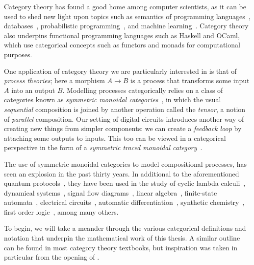 Category theory has found a good home among computer scientists, as
it can be used to shed new light upon topics such as semantics of programming
languages~\cite{oles1982categorytheoretic}, databases~\cite{spivak2012functorial},
probabilistic programming~\cite{cho2019disintegration,fritz2020synthetic}, and
machine learning~\cite{fong2019backprop,cockett2020reverse}.
Category theory also underpins functional programming languages such as
Haskell and OCaml, which use categorical concepts such as functors and monads
for computational purposes.

One application of category theory we are particularly interested in is that of
\emph{process theories}; here a morphism \(A \to B\) is a process that
transforms some input \(A\) into an output \(B\).
Modelling processes categorically relies on a class of categories known as
\emph{symmetric monoidal categories}~\cite{maclane1963natural}, in which the
usual \emph{sequential} composition is joined by another operation called the
\emph{tensor}, a notion of \emph{parallel} composition.
Our setting of digital circuits introduces another way of creating new things
from simpler components: we can create a \emph{feedback loop} by attaching some
outputs to inputs.
This too can be viewed in a categorical perspective in the form of a
\emph{symmetric traced monoidal category}~\cite{joyal1996traced}.

The use of symmetric monoidal categories to model compositional processes, has
seen an explosion in the past thirty years.
In additional to the aforementioned quantum protocols~\cite{coecke2008interacting},
they have been used in the study of cyclic lambda
calculi~\cite{hasegawa1997recursion}, dynamical
systems~\cite{baez2015categories,fong2016categorical}, signal flow
diagrams~\cite{bonchi2014categorical,bonchi2015full,bonchi2017refinement,bonchi2021survey},
linear algebra~\cite{bonchi2017interacting,zanasi2015interacting,bonchi2019graphical,boisseau2022graphical},
finite-state automata~\cite{piedeleu2021string,piedeleu2022finite}, electrical
circuits~\cite{boisseau2022string}, automatic
differentiation~\cite{alvarez-picallo2023functorial}, synthetic
chemistry~\cite{gale2023categorical}, first order
logic~\cite{bonchi2024diagrammatic}, among many others.

To begin, we will take a meander through the various categorical definitions and
notation that underpin the mathematical work of this thesis.
A similar outline can be found in most category theory textbooks, but
inspiration was taken in particular from the opening of
\cite{ghica2023hierarchical}.









